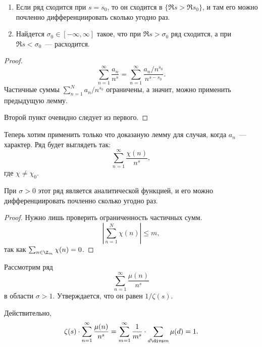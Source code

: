 \begin{theorem}\label{42}
  \begin{enumerate}
    \item Если ряд сходится при $s = s_0$, то он сходится в $\{\Re s > \Re s_0\}$, 
          и там его можно почленно дифференциировать сколько угодно раз.
    \item Найдется $\sigma_0 \in [-\infty, \infty]$ такое, что при $\Re s > \sigma_0$
       ряд сходится, а при $\Re s < \sigma_0$~— расходится.
   \end{enumerate}
\end{theorem}
\begin{proof}
  $$
    \sum_{n=1}^{\infty}\frac{a_n}{n^s} = \sum_{n = 1}^{\infty} \frac{a_n / n^{s_0}}{n^{s - s_0}}.
  $$
  Частичные суммы $\sum_{n=1}^N a_n / n^{s_0}$ ограничены, а значит, можно применить предыдущую лемму.
  
  Второй пункт очевидно следует из первого.
\end{proof}

Теперь хотим применить только что доказаную лемму для случая, когда $a_n$~— характер. Ряд будет выглядеть так:
$$
  \sum_{n=1}^{\infty} \frac{\chi(n)}{n^s},
$$
где $\chi \ne \chi_0$.

\begin{lemma}
  При $\sigma > 0$ этот ряд является аналитической функцией, и его можно дифференциировать почленно сколько угодно раз.
\end{lemma}
\begin{proof}
  Нужно лишь проверить ограниченность частичных сумм.
  $$
    \left| \sum_{n=1}^N \chi(n) \right| \leqslant m,
  $$
  так как $\sum_{n \in \Z_m} \chi(n) = 0$.
\end{proof}

Рассмотрим ряд
$$
  \sum_{n=1}^{\infty} \frac{\mu(n)}{n^s}
$$
в области $\sigma > 1$. Утверждается, что он равен $1 / \zeta(s)$.

Действительно,
$$
  \zeta(s) \cdot \sum_{n=1}^{\infty} \frac{\mu(n)}{n^s} =
  \sum_{m=1}^{\infty}\frac{1}{m^s} \cdot \sum_{d \divs m} \mu(d) = 1.
$$
